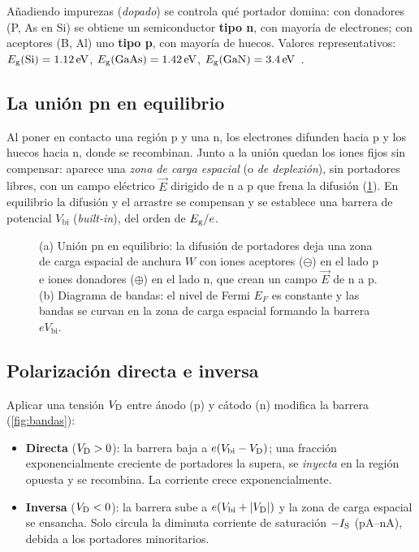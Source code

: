 \documentclass[11pt,a4paper]{article}
\begin{document}
Añadiendo impurezas (\emph{dopado}) se controla qué portador domina: con
donadores (P, As en Si) se obtiene un semiconductor \textbf{tipo n}, con
mayoría de electrones; con aceptores (B, Al) uno \textbf{tipo p}, con
mayoría de huecos. Valores representativos: $E_{\mathrm g}(\text{Si})=\SI{1.12}{eV}$,
$E_{\mathrm g}(\text{GaAs})=\SI{1.42}{eV}$, $E_{\mathrm g}(\text{GaN})=\SI{3.4}{eV}$~\cite{sze}.

\subsection{La unión pn en equilibrio}

Al poner en contacto una región p y una n, los electrones difunden hacia p y
los huecos hacia n, donde se recombinan. Junto a la unión quedan los iones
fijos sin compensar: aparece una \emph{zona de carga espacial} (o \emph{de
deplexión}), sin portadores libres, con un campo eléctrico $\vec E$ dirigido
de n a p que frena la difusión (\cref{fig:union}). En equilibrio la difusión
y el arrastre se compensan y se establece una barrera de potencial
$V_{\text{bi}}$ (\emph{built-in}), del orden de $E_{\mathrm g}/e$.

\begin{figure}[htbp]
  \centering
  
  \caption{(a) Unión pn en equilibrio: la difusión de portadores deja una zona
  de carga espacial de anchura $W$ con iones aceptores ($\ominus$) en el lado p
  e iones donadores ($\oplus$) en el lado n, que crean un campo $\vec E$ de n
  a p. (b) Diagrama de bandas: el nivel de Fermi $E_F$ es constante y las
  bandas se curvan en la zona de carga espacial formando la barrera
  $eV_{\text{bi}}$.}
  \label{fig:union}
\end{figure}

\subsection{Polarización directa e inversa}

Aplicar una tensión $V_{\mathrm D}$ entre ánodo (p) y cátodo (n) modifica la barrera
(\cref{fig:bandas}):
\begin{itemize}
  \item \textbf{Directa} ($V_{\mathrm D}>0$): la barrera baja a $e(V_{\text{bi}}-V_{\mathrm D})$;
    una fracción exponencialmente creciente de portadores la supera, se
    \emph{inyecta} en la región opuesta y se recombina. La corriente crece
    exponencialmente.
  \item \textbf{Inversa} ($V_{\mathrm D}<0$): la barrera sube a
    $e(V_{\text{bi}}+|V_{\mathrm D}|)$ y la zona de carga espacial se ensancha. Solo
    circula la diminuta corriente de saturación $-I_{\mathrm S}$ (pA--nA), debida a los
    portadores minoritarios.
\end{itemize}
\end{document}
